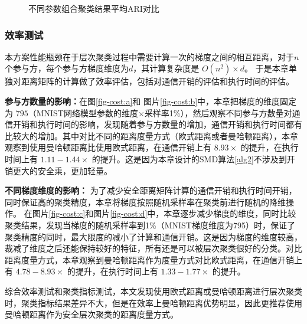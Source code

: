\begin{figure}[htb]
{\begin{minipage}[b]{0.45\textwidth}
		\end{minipage}
	}
	\caption{不同参数组合聚类结果平均ARI对比}
	\label{hc-res-cmp}
\end{figure}

\subsubsection{效率测试}
本方案性能瓶颈在于层次聚类过程中需要计算一次的梯度之间的相互距离，对于$n$个参与方，每个参与方梯度维度为$d$，其计算复杂度是 $O(n^2)\times d$。
于是本章单独对距离矩阵的计算做了效率评估，包括对通信开销的评估和执行时间的评估。

\textbf{参与方数量的影响：}在图\ref{fig-cost:a}和 图片\ref{fig-cost:b}中，本章把梯度的维度固定为 $795$（MNIST网络模型参数的维度$\times$采样率1\%），然后观察不同参与方数量对通信开销和执行时间的影响，发现随着参与方数量的增加，通信开销和执行时间都有比较大的增加。其中对比不同的距离度量方式（欧式距离或者曼哈顿距离），本章观察到使用曼哈顿距离比使用欧式距离，在通信开销上有 $8.93\times$ 的提升，在执行时间上有 $1.11-1.44\times$ 的提升。这是因为本章设计的SMD算法\ref{alg2}不涉及到开销更大的安全乘，更加轻量。

\textbf{不同梯度维度的影响：}
为了减少安全距离矩阵计算的通信开销和执行时间开销，同时保证高的聚类精度，本章将梯度按照随机采样率在聚类前进行随机的降维操作。
在图片\ref{fig-cost:c}和图片\ref{fig-cost:d}中，本章逐步减少梯度的维度，同时比较聚类结果，发现当梯度的随机采样率到1\%（MNIST梯度维度为795）时，保证了聚类精度的同时，最大限度的减小了计算和通信开销。这是因为梯度的维度较高，裁减了维度之后还能保持较好的特征，所有还是可以被层次聚类很好的分类。对比距离度量方式，本章观察到曼哈顿距离作为度量方式对比欧式距离，在通信开销上有 $4.78-8.93 \times$ 的提升，在执行时间上有 $1.33-1.77\times$ 的提升。

综合效率测试和聚类指标测试，本文发现使用欧式距离或曼哈顿距离进行层次聚类时，聚类指标结果差异不大，但是在效率上曼哈顿距离优势明显，因此更推荐使用曼哈顿距离作为安全层次聚类的距离度量方式。

